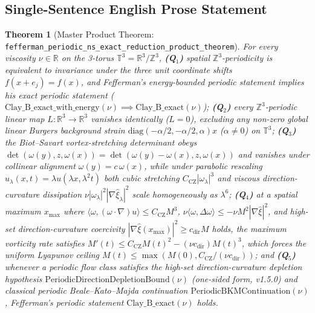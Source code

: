 \documentclass[11pt,a4paper]{article}
\newtheorem{theorem}{Theorem}[section]
\theoremstyle{definition}
\begin{document}
\subsection{Single-Sentence English Prose Statement}
\begin{theorem}[Master Product Theorem: \texttt{fefferman\_periodic\_ns\_exact\_reduction\_product\_theorem}]
For every viscosity $\nu \in \mathbb{R}$ on the 3-torus $\mathbb{T}^3 = \mathbb{R}^3/\mathbb{Z}^3$, \textbf{(Q$_1$)} spatial $\mathbb{Z}^3$-periodicity is equivalent to invariance under the three unit coordinate shifts $f(x+e_j)=f(x)$, and Fefferman's energy-bounded periodic statement implies his exact periodic statement ($\mathrm{Clay\_B\_exact\_with\_energy}(\nu) \implies \mathrm{Clay\_B\_exact}(\nu)$); \textbf{(Q$_2$)} every $\mathbb{Z}^3$-periodic linear map $L : \mathbb{R}^3 \to \mathbb{R}^3$ vanishes identically ($L = 0$), excluding any non-zero global linear Burgers background strain $\mathrm{diag}(-\alpha/2,-\alpha/2,\alpha)x$ ($\alpha \neq 0$) on $\mathbb{T}^3$; \textbf{(Q$_3$)} the Biot--Savart vortex-stretching determinant obeys $\det(\omega(y),z,\omega(x)) = \det(\omega(y)-\omega(x),z,\omega(x))$ and vanishes under collinear alignment $\omega(y)=c\,\omega(x)$, while under parabolic rescaling $u_\lambda(x,t)=\lambda u(\lambda x,\lambda^2 t)$ both cubic stretching $C_{\mathrm{CZ}}|\omega_\lambda|^3$ and viscous direction-curvature dissipation $\nu|\omega_\lambda|^2|\nabla\hat{\xi}_\lambda|^2$ scale homogeneously as $\lambda^6$; \textbf{(Q$_4$)} at a spatial maximum $x_{\max}$ where $\langle\omega,(\omega\cdot\nabla)u\rangle \le C_{\mathrm{CZ}}M^3$, $\nu\langle\omega,\Delta\omega\rangle \le -\nu M^2|\nabla\hat{\xi}|^2$, and high-set direction-curvature coercivity $|\nabla\hat{\xi}(x_{\max})|^2 \ge c_{\mathrm{dir}}M$ holds, the maximum vorticity rate satisfies $M'(t) \le C_{\mathrm{CZ}}M(t)^2 - (\nu c_{\mathrm{dir}})M(t)^3$, which forces the uniform Lyapunov ceiling $M(t) \le \max(M(0), C_{\mathrm{CZ}}/(\nu c_{\mathrm{dir}}))$; and \textbf{(Q$_5$)} whenever a periodic flow class satisfies the high-set direction-curvature depletion hypothesis $\mathrm{PeriodicDirectionDepletionBound}(\nu)$ (one-sided form, v1.5.0) and classical periodic Beale--Kato--Majda continuation $\mathrm{PeriodicBKMContinuation}(\nu)$, Fefferman's periodic statement $\mathrm{Clay\_B\_exact}(\nu)$ holds.
\end{theorem}
\end{document}
